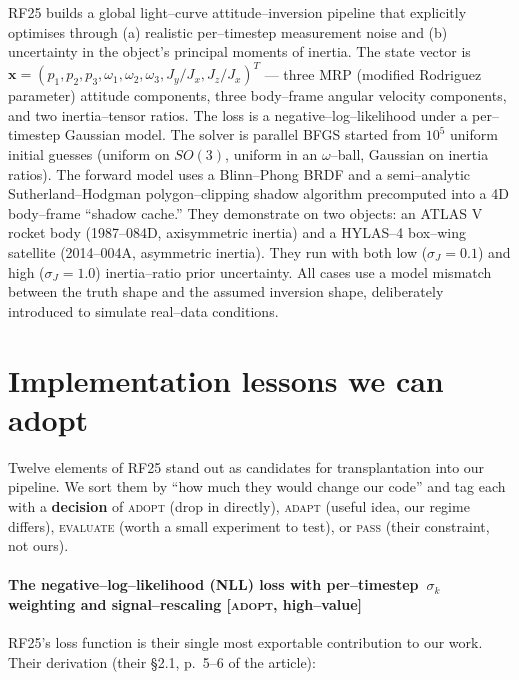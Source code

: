 \documentclass[11pt]{article}
\begin{document}
\noindent
RF25 builds a global light--curve attitude--inversion pipeline that explicitly
optimises through (a) realistic per--timestep measurement noise and (b)
uncertainty in the object's principal moments of inertia. The state vector is
$\mathbf{x} = (p_1, p_2, p_3, \omega_1, \omega_2, \omega_3, J_y/J_x,
J_z/J_x)^T$ --- three MRP (modified Rodriguez parameter) attitude components,
three body--frame angular velocity components, and two inertia--tensor ratios.
The loss is a negative--log--likelihood under a per--timestep Gaussian model.
The solver is parallel BFGS started from $10^5$ uniform initial guesses
(uniform on $SO(3)$, uniform in an $\omega$--ball, Gaussian on inertia ratios).
The forward model uses a Blinn--Phong BRDF and a semi--analytic Sutherland--Hodgman
polygon--clipping shadow algorithm precomputed into a 4D body--frame
``shadow cache.'' They demonstrate on two objects: an ATLAS V rocket body (1987--084D,
axisymmetric inertia) and a HYLAS--4 box--wing satellite (2014--004A,
asymmetric inertia). They run with both low ($\sigma_J = 0.1$) and high
($\sigma_J = 1.0$) inertia--ratio prior uncertainty. All cases use a model
mismatch between the truth shape and the assumed inversion shape, deliberately
introduced to simulate real--data conditions.

\part{Implementation lessons we can adopt}
\label{part:implementation}

\noindent
Twelve elements of RF25 stand out as candidates for transplantation into our
pipeline. We sort them by ``how much they would change our code'' and tag each
with a \textbf{decision} of \textsc{adopt} (drop in directly), \textsc{adapt}
(useful idea, our regime differs), \textsc{evaluate} (worth a small experiment
to test), or \textsc{pass} (their constraint, not ours).

\subsection{The negative--log--likelihood (NLL) loss with per--timestep~$\sigma_k$ weighting and signal--rescaling \textnormal{[\textsc{adopt}, high--value]}}

\noindent
RF25's loss function is their single most exportable contribution to our work.
Their derivation (their \S2.1, p.~5--6 of the article):
\end{document}
